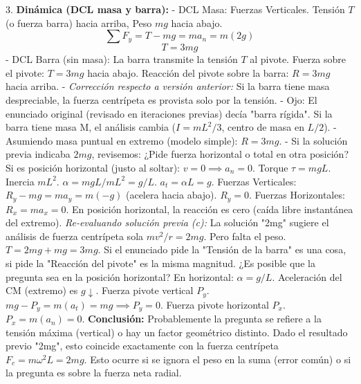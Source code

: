 \documentclass{article}
\begin{document}
3. \textbf{Dinámica (DCL masa y barra):}
   - DCL Masa: Fuerzas Verticales. Tensión $T$ (o fuerza barra) hacia arriba, Peso $mg$ hacia abajo.
     $$ \sum F_y = T - mg = m a_n = m(2g) $$
     $$ T = 3mg $$
   - DCL Barra (sin masa):
     La barra transmite la tensión $T$ al pivote.
     Fuerza sobre el pivote: $T = 3mg$ hacia abajo.
     Reacción del pivote sobre la barra: $R = 3mg$ hacia arriba.
   - \textit{Corrección respecto a versión anterior:} Si la barra tiene masa despreciable, la fuerza centrípeta es provista solo por la tensión.
   - Ojo: El enunciado original (revisado en iteraciones previas) decía "barra rígida". Si la barra tiene masa M, el análisis cambia ($I=mL^2/3$, centro de masa en $L/2$).
   - Asumiendo masa puntual en extremo (modelo simple): $R = 3mg$.
   - Si la solución previa indicaba $2mg$, revisemos:
     ¿Pide fuerza horizontal o total en otra posición?
     Si es posición horizontal (justo al soltar):
     $v=0 \implies a_n = 0$.
     Torque $\tau = mgL$. Inercia $mL^2$. $\alpha = mgL/mL^2 = g/L$.
     $a_t = \alpha L = g$.
     Fuerzas Verticales: $R_y - mg = m a_y = m(-g)$ (acelera hacia abajo). $R_y = 0$.
     Fuerzas Horizontales: $R_x = m a_x = 0$.
     En posición horizontal, la reacción es cero (caída libre instantánea del extremo).
     \textit{Re-evaluando solución previa (c):} La solución "2mg" sugiere el análisis de fuerza centrípeta sola $mv^2/r = 2mg$. Pero falta el peso. $T = 2mg + mg = 3mg$.
     Si el enunciado pide la "Tensión de la barra" es una cosa, si pide la "Reacción del pivote" es la misma magnitud.
     ¿Es posible que la pregunta sea en la posición horizontal?
     En horizontal: $\alpha = g/L$. Aceleración del CM (extremo) es $g \downarrow$.
     Fuerza pivote vertical $P_y$. $mg - P_y = m(a_t) = mg \implies P_y = 0$.
     Fuerza pivote horizontal $P_x$. $P_x = m(a_n) = 0$.
     \textbf{Conclusión:} Probablemente la pregunta se refiere a la tensión máxima (vertical) o hay un factor geométrico distinto.
     Dado el resultado previo "2mg", esto coincide exactamente con la fuerza centrípeta $F_c = m \omega^2 L = 2mg$.
     Esto ocurre si se ignora el peso en la suma (error común) o si la pregunta es sobre la fuerza neta radial.

\noindent{}
\end{document}
